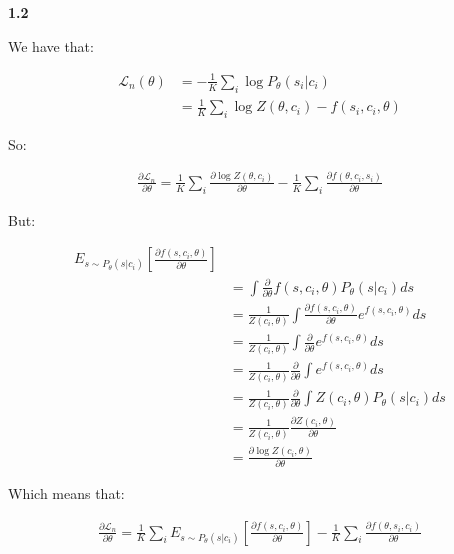 \documentclass[11pt]{article}
\begin{document}
\textbf{1.2}

We have that:

\begin{align*}
\mathcal L_n(\theta) &= -\frac1K \sum_i \log P_{\theta}(s_i | c_i)
\\&= \frac1K \sum_i \log Z(\theta, c_i) - f(s_i, c_i, \theta)
\end{align*}

So:

\begin{align*}
\frac{\partial \mathcal L_n}{\partial \theta}
= \frac1K \sum_i \frac{\partial \log Z(\theta, c_i)}{\partial \theta}
- \frac1K \sum_i  \frac{\partial f(\theta, c_i, s_i)}{\partial \theta}
\end{align*}

But:

\begin{align*}
E_{s \sim P_{\theta}(s | c_i)}[ \frac{\partial f(s, c_i, \theta)}{\partial \theta}]
\\&=  \int \frac{\partial}{\partial \theta} f(s, c_i, \theta) P_{\theta}(s | c_i) ds
\\&=  \frac1{Z(c_i, \theta)} \int \frac{\partial f(s, c_i, \theta)}{\partial \theta} e^{f(s, c_i, \theta)} ds
\\&=  \frac1{Z(c_i, \theta)} \int \frac{\partial}{\partial \theta} e^{f(s, c_i, \theta)} ds
\\&=  \frac1{Z(c_i, \theta)} \frac{\partial}{\partial \theta} \int  e^{f(s, c_i, \theta)} ds
\\&=  \frac1{Z(c_i, \theta)} \frac{\partial}{\partial \theta} \int Z(c_i, \theta) P_{\theta}(s | c_i)  ds
\\&=  \frac1{Z(c_i, \theta)} \frac{\partial Z(c_i, \theta)}{\partial \theta}
\\&= \frac{\partial \log Z(c_i, \theta)}{\partial \theta} 
\end{align*}

Which means that:

\begin{align*}
\frac{\partial \mathcal L_n}{\partial \theta}
= \frac1K \sum_i E_{s \sim P_{\theta}(s | c_i)}[ \frac{\partial f(s, c_i, \theta)}{\partial \theta}]
- \frac1K \sum_i  \frac{\partial f(\theta, s_i, c_i)}{\partial \theta}
\end{align*}
\end{document}
